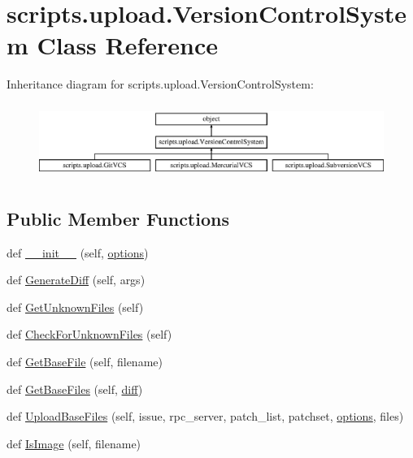 \hypertarget{classscripts_1_1upload_1_1_version_control_system}{}\section{scripts.\+upload.\+Version\+Control\+System Class Reference}
\label{classscripts_1_1upload_1_1_version_control_system}
Inheritance diagram for scripts.\+upload.\+Version\+Control\+System\+:\begin{figure}[H]
\begin{center}
\leavevmode
\includegraphics[height=2.456140cm]{d8/d6c/classscripts_1_1upload_1_1_version_control_system}
\end{center}
\end{figure}
\subsection*{Public Member Functions}
\begin{DoxyCompactItemize}
\item 
def \mbox{\hyperlink{classscripts_1_1upload_1_1_version_control_system_af9abfef93ba0921f6c63b51309c8d711}{\+\_\+\+\_\+init\+\_\+\+\_\+}} (self, \mbox{\hyperlink{classscripts_1_1upload_1_1_version_control_system_a090853e1034cd5dfe4fd0118201e5af1}{options}})
\item 
def \mbox{\hyperlink{classscripts_1_1upload_1_1_version_control_system_ac687c3bb7840db1b27f323ca8d63c89b}{Generate\+Diff}} (self, args)
\item 
def \mbox{\hyperlink{classscripts_1_1upload_1_1_version_control_system_a622bbb4e8be9c1cdfde8aa1af1f7f553}{Get\+Unknown\+Files}} (self)
\item 
def \mbox{\hyperlink{classscripts_1_1upload_1_1_version_control_system_af5b69f633b49f4c56538cf705c1bba07}{Check\+For\+Unknown\+Files}} (self)
\item 
def \mbox{\hyperlink{classscripts_1_1upload_1_1_version_control_system_ae50b1c259d0f1e12e855a142c8ee04e4}{Get\+Base\+File}} (self, filename)
\item 
def \mbox{\hyperlink{classscripts_1_1upload_1_1_version_control_system_ac15baf4dac8cf3d88ab3bd12853f38e9}{Get\+Base\+Files}} (self, \mbox{\hyperlink{_mutual_8cpp_ae6c31fc00bc7f0cfda97440db3377063}{diff}})
\item 
def \mbox{\hyperlink{classscripts_1_1upload_1_1_version_control_system_a51e1062c1bcc11b77c9819e63c158901}{Upload\+Base\+Files}} (self, issue, rpc\+\_\+server, patch\+\_\+list, patchset, \mbox{\hyperlink{classscripts_1_1upload_1_1_version_control_system_a090853e1034cd5dfe4fd0118201e5af1}{options}}, files)
\item 
def \mbox{\hyperlink{classscripts_1_1upload_1_1_version_control_system_a72f3cbed49e955ae7f89496302ec4b9f}{Is\+Image}} (self, filename)
\end{DoxyCompactItemize}
